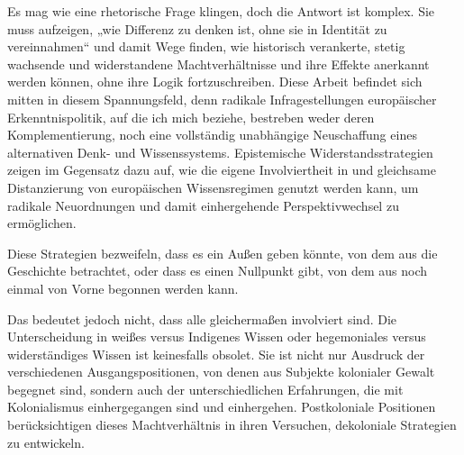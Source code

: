 Es mag wie eine rhetorische Frage klingen, doch die Antwort ist komplex. Sie
muss aufzeigen, „wie Differenz zu denken ist, ohne sie in Identität zu
vereinnahmen“\footnotemark{} und damit Wege finden, wie historisch verankerte, stetig
wachsende und widerstandene Machtverhältnisse und ihre Effekte anerkannt werden
können, ohne ihre Logik fortzuschreiben. Diese Arbeit befindet sich mitten in
diesem Spannungsfeld, denn radikale Infragestellungen europäischer
Erkenntnispolitik, auf die ich mich beziehe, bestreben weder deren
Komplementierung, noch eine vollständig unabhängige Neuschaffung eines
alternativen Denk- und Wissenssystems. Epistemische
Widerstandsstrategien\footnotemark{} zeigen im Gegensatz dazu
  auf, wie die eigene Involviertheit in und gleichsame Distanzierung von
  europäischen Wissensregimen genutzt werden kann, um radikale Neuordnungen und
  damit einhergehende Perspektivwechsel zu ermöglichen.

  Diese Strategien bezweifeln, dass es ein Außen geben könnte, von dem aus die
  Geschichte betrachtet, oder dass es einen Nullpunkt gibt, von dem aus noch
  einmal von Vorne begonnen werden kann.

  Das bedeutet jedoch nicht, dass alle gleichermaßen involviert sind. Die
  Unterscheidung in weißes versus Indigenes Wissen oder hegemoniales versus
  widerständiges Wissen ist keinesfalls obsolet. Sie ist nicht nur Ausdruck der
  verschiedenen Ausgangspositionen, von denen aus Subjekte kolonialer Gewalt
  begegnet sind, sondern auch der unterschiedlichen Erfahrungen, die mit
  Kolonialismus einhergegangen sind und einhergehen. Postkoloniale Positionen
  berücksichtigen dieses Machtverhältnis in ihren Versuchen, dekoloniale
  Strategien zu entwickeln.\\

